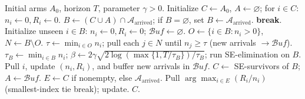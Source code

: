 \documentclass[
  12pt]{article}
\begin{document}
\begin{algorithm}[htbp]
\caption{\textbf{Dynamic SE}}
\begin{algorithmic}[1]
\Require Initial arms $A_0$, horizon $T$, parameter $\gamma>0$.
\State Initialize $C\gets A_0$, $A\gets\varnothing$; for $i\in C$: $n_i\gets0, R_i\gets0$.
    \State $B\gets (C\cup A)\cap\mathcal{A}_{\mathrm{arrived}}$; if $B=\varnothing$, set $B\gets\mathcal{A}_{\mathrm{arrived}}$.
     \State \textbf{break}. \EndIf
    \State Initialize unseen $i\in B$: $n_i\gets0, R_i\gets0$; $\mathcal{B}uf\gets\varnothing$.
    \State $O\gets\{i\in B:n_i>0\}$, $N\gets B\setminus O$.
        \State $\tau\gets\min_{i\in O}n_i$; pull each $j\in N$ until $n_j\ge\tau$ (new arrivals $\to\mathcal{B}uf$).
        \State $\tau_B\gets\min_{i\in B}n_i$; $\beta\gets2\gamma\sqrt{2\log(\max\{1,T/\tau_B\})/\tau_B}$; run SE-elimination on $B$.
    \EndIf
        \State Pull $i$, update $(n_i,R_i)$, and buffer new arrivals in $\mathcal{B}uf$.
    \EndFor
    \State $C\gets$ SE-survivors of $B$; $A\gets\mathcal{B}uf$.
\EndWhile
\State $E\gets C$ if nonempty, else $\mathcal{A}_{\mathrm{arrived}}$.
    \State Pull $\arg\max_{i\in E}(R_i/n_i)$ (smallest-index tie break); update.
\EndWhile
\State \Return $C$.
\end{algorithmic}
\end{algorithm}
\end{document}
